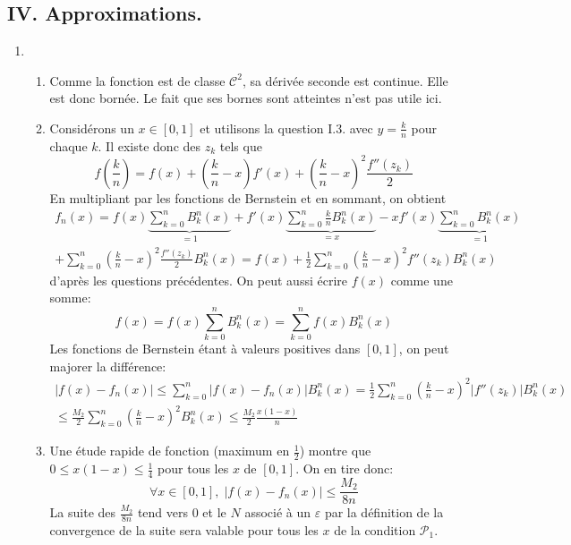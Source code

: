 \subsection*{IV. Approximations.}
\begin{enumerate}
 \item
\begin{enumerate}
 \item Comme la fonction est de classe $\mathcal{C}^2$, sa dérivée seconde est continue. Elle est donc bornée. Le fait que ses bornes sont atteintes n'est pas utile ici.

 \item Considérons un $x\in[0,1]$ et utilisons la question I.3. avec $y=\frac{k}{n}$ pour chaque $k$. Il existe donc des $z_k$ tels que 
\begin{displaymath}
 f(\frac{k}{n}) = f(x) +(\frac{k}{n}-x)f'(x) + (\frac{k}{n}-x)^2\frac{f''(z_k)}{2} 
\end{displaymath}
En multipliant par les fonctions de Bernstein et en sommant, on obtient
\begin{multline*}
 f_n(x)
= f(x)\underset{=1}{\underbrace{\sum_{k=0}^nB^n_k(x)}} 
+ f'(x)\underset{=x}{\underbrace{\sum_{k=0}^n \frac{k}{n}B^n_k(x)}}
- xf'(x)\underset{=1}{\underbrace{\sum_{k=0}^nB^n_k(x)}}\\
+ \sum_{k=0}^n(\frac{k}{n}-x)^2\frac{f''(z_k)}{2}B^n_k(x)
= f(x) + \frac{1}{2}\sum_{k=0}^n(\frac{k}{n}-x)^2 f''(z_k)B^n_k(x)
\end{multline*}
 d'après les questions précédentes. On peut aussi écrire $f(x)$ comme une somme:
\begin{displaymath}
 f(x) = f(x)\sum_{k=0}^nB^n_k(x) = \sum_{k=0}^n f(x)B^n_k(x)
\end{displaymath}
Les fonctions de Bernstein étant à valeurs positives dans $[0,1]$, on peut majorer la différence:
\begin{multline*}
 \left|f(x)-f_n(x)\right| \leq \sum_{k=0}^n \left|f(x)-f_n(x)\right|B^n_k(x)
=  \frac{1}{2}\sum_{k=0}^n(\frac{k}{n}-x)^2 |f''(z_k)| B^n_k(x)\\
\leq \frac{M_2}{2}\sum_{k=0}^n(\frac{k}{n}-x)^2  B^n_k(x)
\leq \frac{M_2}{2} \frac{x(1-x)}{n}
\end{multline*}

 \item Une étude rapide de fonction (maximum en $\frac{1}{2}$) montre que $0\leq x(1-x) \leq \frac{1}{4}$ pour tous les $x$ de $[0,1]$. On en tire donc:
\begin{displaymath}
 \forall x\in [0,1],\;
\left|f(x)-f_n(x)\right| \leq \frac{M_2}{8n}
\end{displaymath}
La suite des $\frac{M_2}{8n}$ tend vers $0$ et le $N$ associé à un $\varepsilon$ par la définition de la convergence de la suite sera valable pour tous les $x$ de la condition $\mathcal{P}_1$.
\end{enumerate}
 

\end{enumerate}
